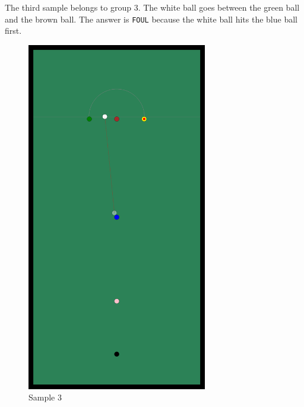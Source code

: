 The third sample belongs to group $3$. The white ball goes between the green ball and the brown ball. The answer is \texttt{FOUL} because the white ball hits the blue ball first.
\begin{figure}[ht!]
  \centering
    \includegraphics[width=0.7\textwidth]{sample3}
  \caption{Sample 3}
\end{figure}

